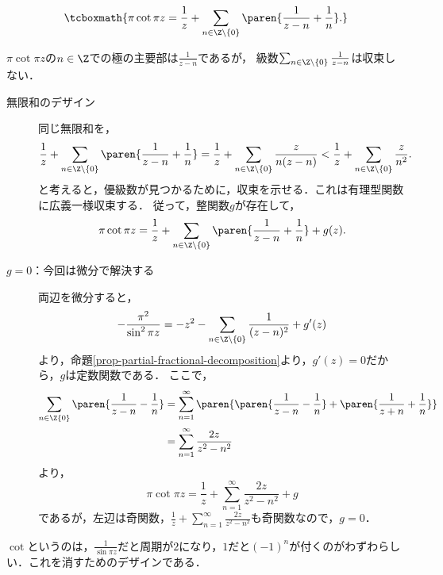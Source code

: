 \documentclass[uplatex, dvipdfmx]{jsreport}
\begin{document}
\begin{proposition}[１位の極を持つもの]
    \[\tcboxmath{\pi\cot\pi z=\frac{1}{z}+\sum_{n\in\Z\setminus\{0\}}\paren{\frac{1}{z-n}+\frac{1}{n}}.}\]
\end{proposition}
\begin{Proof}
    $\pi\cot\pi z$の$n\in\Z$での極の主要部は$\frac{1}{z-n}$であるが，
    級数$\sum_{n\in\Z\setminus\{0\}}\frac{1}{z-n}$は収束しない．
    \begin{description}
        \item[無限和のデザイン] 同じ無限和を，
        \[\frac{1}{z}+\sum_{n\in\Z\setminus\{0\}}\paren{\frac{1}{z-n}+\frac{1}{n}}=\frac{1}{z}+\sum_{n\in\Z\setminus\{0\}}\frac{z}{n(z-n)}<\frac{1}{z}+\sum_{n\in\Z\setminus\{0\}}\frac{z}{n^2}.\]
        と考えると，優級数が見つかるために，収束を示せる．これは有理型関数に広義一様収束する．
        従って，整関数$g$が存在して，
        \[\pi\cot\pi z=\frac{1}{z}+\sum_{n\in\Z\setminus\{0\}}\paren{\frac{1}{z-n}+\frac{1}{n}}+g(z).\]
        \item[$g=0$：今回は微分で解決する]
        両辺を微分すると，
        \[-\frac{\pi^2}{\sin^2\pi z}=-z^2-\sum_{n\in\Z\setminus\{0\}}\frac{1}{(z-n)^2}+g'(z)\]
        より，命題\ref{prop-partial-fractional-decomposition}より，$g'(z)=0$だから，$g$は定数関数である．
        ここで，
        \begin{align*}
            \sum_{n\in\Z\{0\}}\paren{\frac{1}{z-n}-\frac{1}{n}}&=\sum^\infty_{n=1}\paren{\paren{\frac{1}{z-n}-\frac{1}{n}}+\paren{\frac{1}{z+n}+\frac{1}{n}}}\\
            &=\sum^\infty_{n=1}\frac{2z}{z^2-n^2}
        \end{align*}
        より，
        \[\pi\cot\pi z=\frac{1}{z}+\sum^\infty_{n=1}\frac{2z}{z^2-n^2}+g\]
        であるが，左辺は奇関数，$\frac{1}{z}+\sum^\infty_{n=1}\frac{2z}{z^2-n^2}$も奇関数なので，$g=0$．
    \end{description}
\end{Proof}
\begin{remarks}
    $\cot$というのは，$\frac{1}{\sin\pi z}$だと周期が$2$になり，$1$だと$(-1)^n$が付くのがわずわらしい．これを消すためのデザインである．
\end{remarks}
\end{document}
